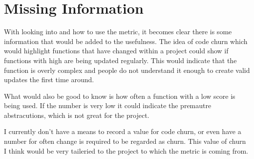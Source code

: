 \section{Missing Information}
With looking into \cc and how to use the metric, it becomes clear there is some information that would be added to the usefulness.
The idea of code churn which would highlight functions that have changed within a project could show if functions with high \cc are being updated regularly.
This would indicate that the function is overly complex and people do not understand it enough to create valid updates the first time around.

What would also be good to know is how often a function with a low \cc score is being used.
If the number is very low it could indicate the premautre abstracutions, which is not great for the project.

I currently don't have a means to record a value for code churn, or even have a number for often change is required to be regarded as churn.
This value of churn I think would be very taileried to the project to which the metric is coming from.